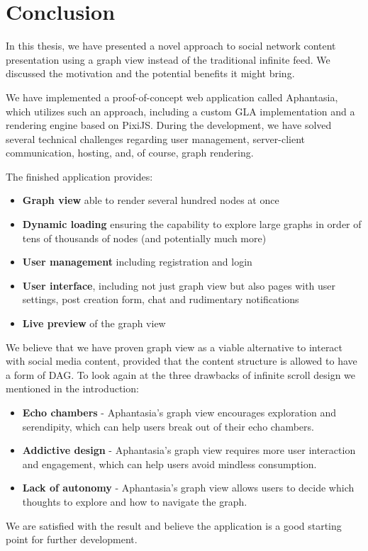 \chapter{Conclusion}

In this thesis, we have presented a novel approach to social network content presentation using a graph view
instead of the traditional infinite feed.
We discussed the motivation and the potential benefits it might bring.

We have implemented a proof-of-concept web application called Aphantasia, which utilizes such an approach, including 
a custom \gls{GLA} implementation and a rendering engine based on PixiJS.
During the development, we have solved several technical challenges regarding user management,
server-client communication, hosting, and, of course, graph rendering.

The finished application provides:
\begin{itemize}
    \item \textbf{Graph view} able to render several hundred nodes at once
    \item \textbf{Dynamic loading} ensuring the capability to explore large graphs in order of tens of thousands of nodes (and potentially much more)
    \item \textbf{User management} including registration and login
    \item \textbf{User interface}, including not just graph view but also pages with user settings, post creation form, chat
 and rudimentary notifications
   \item \textbf{Live preview} of the graph view
\end{itemize}


We believe that we have proven graph view as a viable alternative to interact with social media content,
provided that the content structure is allowed to have a form of \gls{DAG}.
To look again at the three drawbacks of infinite scroll design we mentioned in the introduction:
\begin{itemize}
   \item \textbf{Echo chambers} - Aphantasia's graph view encourages exploration and serendipity, which can help users break out of their echo chambers.
   \item \textbf{Addictive design} - Aphantasia's graph view requires more user interaction and engagement, which can help users avoid mindless consumption.
   \item \textbf{Lack of autonomy} - Aphantasia's graph view allows users to decide which thoughts to explore and how to navigate the graph.
\end{itemize}

We are satisfied with the result and believe the application is a good starting point for further development.
